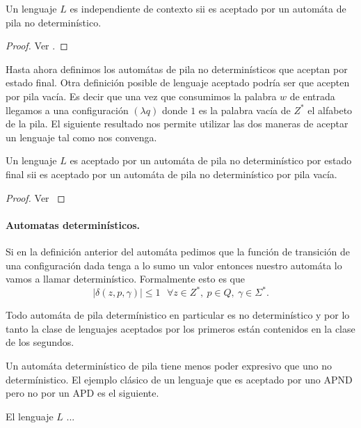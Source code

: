 \documentclass[tesis.tex]{subfiles}
\begin{document}
\medskip
\begin{teo}
Un lenguaje $L$ es independiente de contexto sii es aceptado por un automáta de pila no determinístico.
\end{teo}

\begin{proof}
	Ver \cite{}.
\end{proof}

Hasta ahora definimos los automátas de pila no determinísticos que aceptan por estado final. Otra definición posible de lenguaje aceptado podría ser que acepten por pila vacía. Es decir que una vez que consumimos la palabra $w$ de entrada llegamos a una configuración $(\lambda q)$ donde $1$ es la palabra vacía de $Z^*$ el alfabeto de la pila. El siguiente resultado nos permite utilizar las dos maneras de aceptar un lenguaje tal como nos convenga.

\medskip
\begin{teo}
Un lenguaje $L$ es aceptado por un automáta de pila no determinístico por estado final sii es aceptado por un automáta de pila no determinístico por pila vacía.
\end{teo}

\begin{proof}
	Ver \cite{}
\end{proof}

\paragraph{Automatas determinísticos.} Si en la definición anterior del automáta pedimos que la función de transición de una configuración dada tenga a lo sumo un valor entonces nuestro automáta lo vamos a llamar determinístico. Formalmente esto es que 
\[
|\delta(z,p,\gamma)| \le 1 \ \ \ \forall z \in Z^*, \ p \in Q, \ \gamma \in \Sigma^{*}.
\]

\begin{obs}
	Todo automáta de pila determínistico en particular es no determinístico y por lo tanto la clase de lenguajes aceptados por los primeros están contenidos en la clase de los segundos.
\end{obs}

Un automáta determinístico de pila tiene menos poder expresivo que uno no determínistico. El ejemplo clásico de un lenguaje que es aceptado por uno APND pero no por un APD es el siguiente.

\begin{ej}
	El lenguaje $L$ ...
\end{ej}
\end{document}
